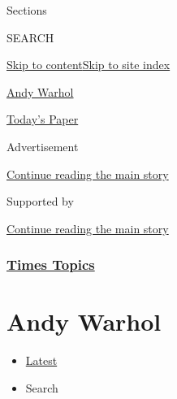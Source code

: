 Sections

SEARCH

\protect\hyperlink{site-content}{Skip to
content}\protect\hyperlink{site-index}{Skip to site index}

\href{https://www.nytimes.com/topic/person/andy-warhol}{Andy Warhol}

\href{https://myaccount.nytimes.com/auth/login?response_type=cookie\&client_id=vi}{}

\href{https://www.nytimes.com/section/todayspaper}{Today's Paper}

Advertisement

\protect\hyperlink{after-top}{Continue reading the main story}

Supported by

\protect\hyperlink{after-sponsor}{Continue reading the main story}

\hypertarget{times-topics}{%
\subsubsection{\texorpdfstring{\href{/index.html}{Times
Topics}}{Times Topics}}\label{times-topics}}

\hypertarget{andy-warhol}{%
\section{Andy Warhol}\label{andy-warhol}}

\begin{itemize}
\tightlist
\item
  \protect\hyperlink{stream-panel}{Latest}
\item
  Search
\end{itemize}

